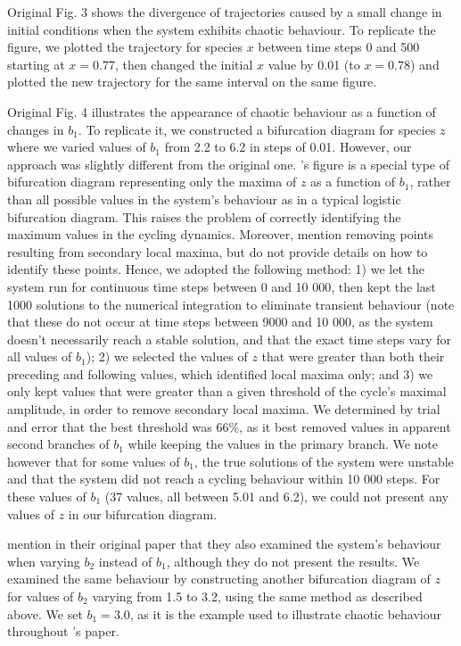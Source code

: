 Original Fig. 3 shows the divergence of trajectories caused by a small change in initial
conditions when the system exhibits chaotic behaviour.
To replicate the figure, we plotted the trajectory for species $x$ between time steps 0
and 500 starting at $x = 0.77$, then changed the initial $x$ value by 0.01 (to $x = 0.78$)
and plotted the new trajectory for the same interval on the same figure.

Original Fig. 4 illustrates the appearance of chaotic behaviour as a function of changes in
$b_1$. To replicate it, we constructed a bifurcation diagram for species $z$ where we
varied values of $b_1$ from 2.2 to 6.2 in steps of 0.01.
However, our approach was slightly different from the original one.
\citeauthor{hastings1991}'s figure is a special type of bifurcation diagram
representing only the maxima of $z$ as a function of $b_1$, rather than all possible
values in the system's behaviour as in a typical logistic bifurcation diagram.
This raises the problem of correctly identifying the maximum values in the cycling
dynamics. Moreover, \citeauthor{hastings1991} mention removing points resulting from
secondary local maxima, but do not provide details on how to identify these points.
Hence, we adopted the following method:
1) we let the system run for continuous time steps between 0 and 10 000, then kept the last 1000 
solutions to the numerical integration to eliminate transient behaviour 
(note that these do not occur at time steps between 9000 and 10 000, as the system doesn't
necessarily reach a stable solution, and that the exact time steps vary for all values of $b_1$);
2) we selected the values of $z$ that were greater than both their preceding and following
values, which identified local maxima only;
and 3) we only kept values that were greater than a given threshold of the cycle's maximal
amplitude, in order to remove secondary local maxima.
We determined by trial and error that the best threshold was 66\%, as it best removed
values in apparent second branches of $b_1$ while keeping the values in the primary
branch. We note however that for some values of $b_1$, the true solutions of the system
were unstable and that the system did not reach a cycling behaviour within 10 000 steps.
For these values of $b_1$ (37 values, all between 5.01 and 6.2), we could not present any
values of $z$ in our bifurcation diagram.

\citeauthor{hastings1991} mention in their original paper that they also examined the system's
behaviour when varying $b_2$ instead of $b_1$, although they do not present the results.
We examined the same behaviour by constructing another bifurcation diagram of $z$ for
values of $b_2$ varying from 1.5 to 3.2, using the same method as described above.
We set $b_1 = 3.0$, as it is the example used to illustrate chaotic behaviour throughout
\citeauthor{hastings1991}'s paper.

